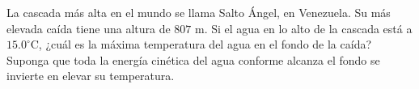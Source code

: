 \item La cascada más alta en el mundo se llama Salto Ángel, en Venezuela. Su más elevada caída tiene una altura de $807 \text{ m}$. Si el agua en lo alto de la cascada está a $15.0 ^\circ\text{C}$, ¿cuál es la máxima temperatura del agua en el fondo de la caída? Suponga que toda la energía cinética del agua conforme alcanza el fondo se invierte en elevar su temperatura.
